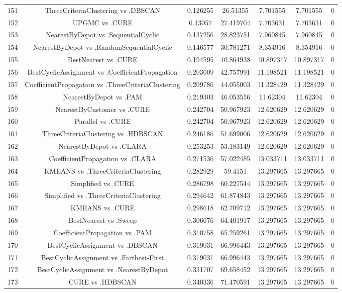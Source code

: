 \documentclass[a4paper,10pt]{article}
\begin{document}
\begin{landscape}
\begin{table}[!htp]
\begin{tabular}{ccccccc}
151&ThreeCriteriaClustering vs .DBSCAN&0.126255&26.51355&7.701555&7.701555&0\\
152&UPGMC vs .CURE&0.13057&27.419704&7.703631&7.703631&0\\
153&NearestByDepot vs .SequentialCyclic&0.137256&28.823751&7.960845&7.960845&0\\
154&NearestByDepot vs .RandomSequentialCyclic&0.146577&30.781271&8.354916&8.354916&0\\
155&BestNearest vs .CURE&0.194595&40.864938&10.897317&10.897317&0\\
156&BestCyclicAssignment vs .CoefficientPropagation&0.203609&42.757991&11.198521&11.198521&0\\
157&CoefficientPropagation vs .ThreeCriteriaClustering&0.209786&44.055003&11.328429&11.328429&0\\
158&NearestByDepot vs .PAM&0.219303&46.053556&11.62304&11.62304&0\\
159&NearestByCustomer vs .CURE&0.242704&50.967923&12.620629&12.620629&0\\
160&Parallel vs .CURE&0.242704&50.967923&12.620629&12.620629&0\\
161&ThreeCriteriaClustering vs .HDBSCAN&0.246186&51.699006&12.620629&12.620629&0\\
162&NearestByDepot vs .CLARA&0.253253&53.183149&12.620629&12.620629&0\\
163&CoefficientPropagation vs .CLARA&0.271536&57.022485&13.033711&13.033711&0\\
164&KMEANS vs .ThreeCriteriaClustering&0.282929&59.4151&13.297665&13.297665&0\\
165&Simplified vs .CURE&0.286798&60.227544&13.297665&13.297665&0\\
166&Simplified vs .ThreeCriteriaClustering&0.294642&61.874843&13.297665&13.297665&0\\
167&KMEANS vs .CURE&0.298618&62.709712&13.297665&13.297665&0\\
168&BestNearest vs .Sweep&0.306676&64.401917&13.297665&13.297665&0\\
169&CoefficientPropagation vs .PAM&0.310758&65.259261&13.297665&13.297665&0\\
170&BestCyclicAssignment vs .DBSCAN&0.319031&66.996443&13.297665&13.297665&0\\
171&BestCyclicAssignment vs .Farthest-First&0.319031&66.996443&13.297665&13.297665&0\\
172&BestCyclicAssignment vs .NearestByDepot&0.331707&69.658452&13.297665&13.297665&0\\
173&CURE vs .HDBSCAN&0.340336&71.470591&13.297665&13.297665&0\\

\end{tabular}
\end{table}
\end{landscape}
\end{document}
